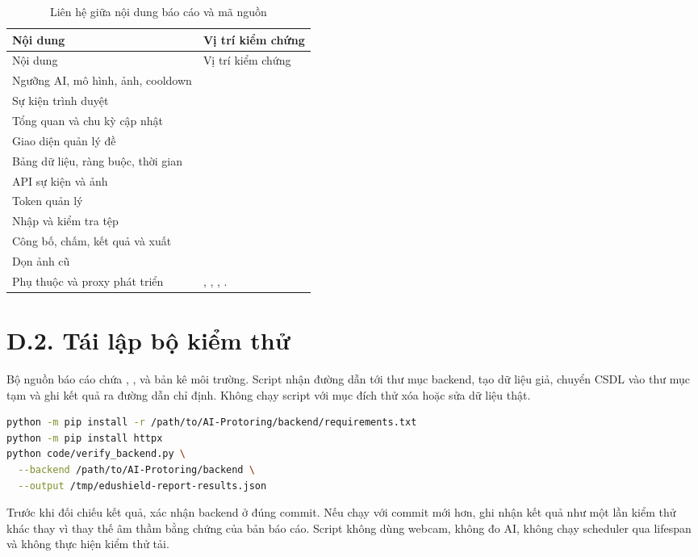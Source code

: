 \begin{longtable}{@{}L{6.1cm}L{8.9cm}@{}}
\caption{Liên hệ giữa nội dung báo cáo và mã nguồn}\\
\toprule Nội dung & Vị trí kiểm chứng \\\midrule\endfirsthead
\toprule Nội dung & Vị trí kiểm chứng \\\midrule\endhead
Ngưỡng AI, mô hình, ảnh, cooldown & \\
Sự kiện trình duyệt & \\
Tổng quan và chu kỳ cập nhật & \\
Giao diện quản lý đề & \\
Bảng dữ liệu, ràng buộc, thời gian & \\
API sự kiện và ảnh & \\
Token quản lý & \\
Nhập và kiểm tra tệp & \\
Công bố, chấm, kết quả và xuất & \\
Dọn ảnh cũ & \\
Phụ thuộc và proxy phát triển & , , , .\\
\bottomrule
\end{longtable}

\section*{D.2. Tái lập bộ kiểm thử}
Bộ nguồn báo cáo chứa , ,  và bản kê môi trường. Script nhận đường dẫn tới thư mục backend, tạo dữ liệu giả, chuyển CSDL vào thư mục tạm và ghi kết quả ra đường dẫn chỉ định. Không chạy script với mục đích thử xóa hoặc sửa dữ liệu thật.

\begin{lstlisting}[language=bash,caption={Chạy lại kiểm thử từ thư mục báo cáo}]
python -m pip install -r /path/to/AI-Protoring/backend/requirements.txt
python -m pip install httpx
python code/verify_backend.py \
  --backend /path/to/AI-Protoring/backend \
  --output /tmp/edushield-report-results.json
\end{lstlisting}
Trước khi đối chiếu kết quả, xác nhận backend ở đúng commit. Nếu chạy với commit mới hơn, ghi nhận kết quả như một lần kiểm thử khác thay vì thay thế âm thầm bằng chứng của bản báo cáo. Script không dùng webcam, không đo AI, không chạy scheduler qua lifespan và không thực hiện kiểm thử tải.

